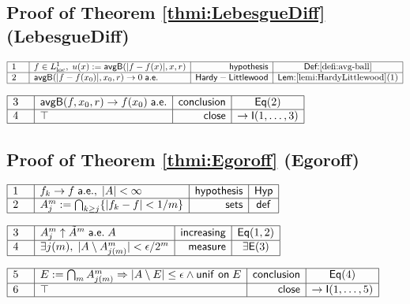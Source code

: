 \documentclass[11pt,reqno]{amsart}
\begin{document}
	\subsection*{Proof of Theorem \protect\ref{thmi:LebesgueDiff} (\textsf{LebesgueDiff})}
	\noindent$\begin{array}{|m{0.5cm}|l|r|c|}
	\hline
	1 & f\in L^{1}_{\mathrm{loc}},\;u(x):=\mathsf{avgB}(|f-f(x)|,x,r) & \mathsf{hypothesis} & \textsf{Def:}\ref{defi:avg-ball} \\ \hline
	2 & \mathsf{avgB}(|f-f(x_{0})|,x_{0},r)\to0\;\mathsf{a.e.} & \mathsf{Hardy-Littlewood} & \textsf{Lem:}\ref{lemi:HardyLittlewood}(1) \\ \hline
	\end{array}$
	\par\nointerlineskip\noindent$\begin{array}{|m{0.5cm}|l|r|c|}
	\hline
	3 & \mathsf{avgB}(f,x_{0},r)\to f(x_{0})\;\mathsf{a.e.} & \mathsf{conclusion} & \mathsf{Eq}(2) \\ \hline
	4 & \top & \mathsf{close} & \to\mathsf{I}(1,\dots,3) \\ \hline
	\end{array}$
	\medskip
	
	\subsection*{Proof of Theorem \protect\ref{thmi:Egoroff} (\textsf{Egoroff})}
	\noindent$\begin{array}{|m{0.5cm}|l|r|c|}
	\hline
	1 & f_{k}\to f\;\mathsf{a.e.},\;|A|<\infty & \mathsf{hypothesis} & \mathsf{Hyp} \\ \hline
	2 & A_{j}^{m}:=\bigcap_{k\ge j}\{|f_{k}-f|<1/m\} & \mathsf{sets} & \mathsf{def} \\ \hline
	\end{array}$
	\par\nointerlineskip\noindent$\begin{array}{|m{0.5cm}|l|r|c|}
	\hline
	3 & A_{j}^{m}\uparrow\tilde{A}^{m}\;\mathsf{a.e.}\;A & \mathsf{increasing} & \mathsf{Eq}(1,2) \\ \hline
	4 & \exists j(m),\;|A\setminus A_{j(m)}^{m}|<\epsilon/2^{m} & \mathsf{measure} & \exists\mathsf{E}(3) \\ \hline
	\end{array}$
	\par\nointerlineskip\noindent$\begin{array}{|m{0.5cm}|l|r|c|}
	\hline
	5 & E:=\bigcap_{m}A_{j(m)}^{m}\Rightarrow|A\setminus E|\le\epsilon\wedge\mathsf{unif\ on}\;E & \mathsf{conclusion} & \mathsf{Eq}(4) \\ \hline
	6 & \top & \mathsf{close} & \to\mathsf{I}(1,\dots,5) \\ \hline
	\end{array}$
	\medskip
	
\end{document}
